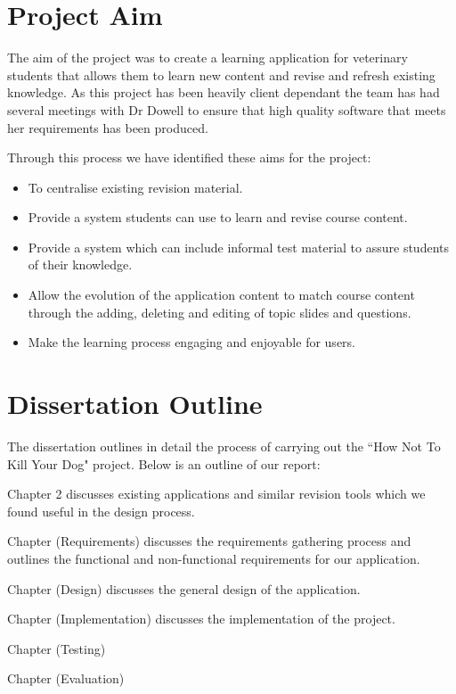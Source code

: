 \documentclass{l3proj}
\begin{document}
\section{Project Aim}

The aim of the project was to create a learning application for veterinary students that allows them to learn new content and revise and refresh existing knowledge. As this project has been heavily client dependant the team has had several meetings with Dr Dowell to ensure that high quality software that meets her requirements has been produced.
\newline

Through this process we have identified these aims for the project:
\newline

\begin{itemize}
\item To centralise existing revision material.
\item Provide a system students can use to learn and revise course content.
\item Provide a system which can include informal test material to assure students of their knowledge.
\item Allow the evolution of the application content to match course content through the adding, deleting and editing of topic slides and questions.
\item Make the learning process engaging and enjoyable for users.
\end{itemize}   

\section{Dissertation Outline}

The dissertation outlines in detail the process of carrying out the ``How Not To Kill Your Dog" project. Below is an outline of our report:

Chapter 2 discusses existing applications and similar revision tools which we found useful in the design process.

Chapter (Requirements) discusses the requirements gathering process and outlines the functional and non-functional requirements for our application.

Chapter (Design) discusses the general design of the application.

Chapter (Implementation) discusses the implementation of the project.

Chapter (Testing)

Chapter (Evaluation)
\end{document}
